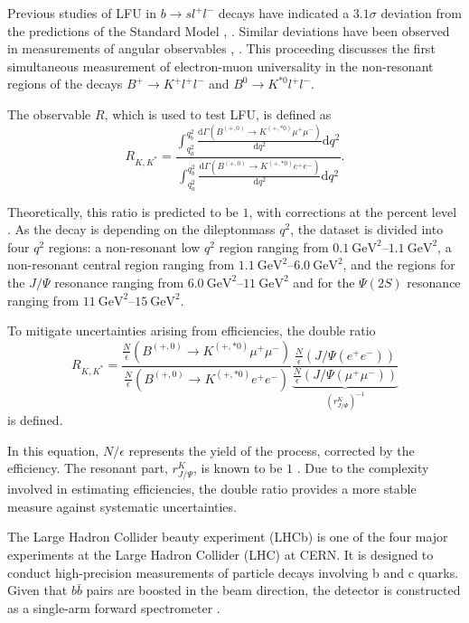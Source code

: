 Previous studies of LFU in $b\to sl^+l^-$ decays have indicated a $\num{3.1}\sigma$ 
deviation from the predictions of the Standard Model \cite{previous_RK}, \cite{previous_RK*}. 
Similar deviations have been observed in measurements of angular observables \cite{angular_1}, 
\cite{angular_2}. This proceeding discusses the first simultaneous measurement of electron-muon 
universality in the non-resonant regions of the decays $B^+\to K^+l^+l^-$ and $B^0\to K^{*0}l^+l^-$.

The observable $R$, which is used to test LFU, is defined as
\begin{equation}
    R_{K,K^*}= 
    \frac{\int_{q_a^2}^{q_b^2}\frac{\mathrm{d}\Gamma(B^{(+,0)}\to K^{(+,*0)}\mu^+\mu^-)}{\mathrm{d}q^2}\mathrm{d}q^2}
    {\int_{q_a^2}^{q_b^2}\frac{\mathrm{d}\Gamma(B^{(+,0)}\to K^{(+,*0)}e^+e^-)}{\mathrm{d}q^2}\mathrm{d}q^2} .
    \label{eqn:single_ratio}
\end{equation}

Theoretically, this ratio is predicted to be $\num{1}$, with corrections at 
the percent level \cite{LU_theo}. 
As the decay is depending on the dileptonmass $q^2$, the dataset is divided into four $q^2$ regions:
a non-resonant low $q^2$ region ranging from
$\SIrange{0.1}{1.1}{\giga\electronvolt\squared}$,
a non-resonant central region ranging from
$\SIrange{1.1}{6.0}{\giga\electronvolt\squared}$,
and the regions for the $J/\Psi$ resonance ranging from 
$\SIrange{6.0}{11}{\giga\electronvolt\squared}$
and for the $\Psi(2S)$ resonance ranging from
$\SIrange{11}{15}{\giga\electronvolt\squared}$.

To mitigate uncertainties arising from efficiencies, the double ratio 
\begin{equation}
    R_{K,K^*}= 
    \frac{\frac{N}{\epsilon}(B^{(+,0)}\to K^{(+,*0)}\mu^+\mu^-)}
    {\frac{N}{\epsilon}(B^{(+,0)}\to K^{(+,*0)}e^+e^-)}
    \underbrace{\frac{\frac{N}{\epsilon}(J/\Psi(e^+e^-))}{\frac{N}{\epsilon}(J/\Psi(\mu^+\mu^-))}}_{(r^K_{J/\Psi})^{-1}}
    \label{eqn:double_ratio}
\end{equation}
is defined.

In this equation, $N/\epsilon$ represents the yield of the process, corrected by 
the efficiency. The resonant part, $r^K_{J/\Psi}$, is known to be $\num{1}$ 
\cite{AULCHENKO2014227}. Due to the complexity involved in estimating efficiencies, 
the double ratio provides a more stable measure against systematic uncertainties.

The Large Hadron Collider beauty experiment (LHCb) is one of the four major experiments 
at the Large Hadron Collider (LHC) at CERN. It is designed to conduct high-precision 
measurements of particle decays involving b and c quarks. Given that $b\bar{b}$ pairs 
are boosted in the beam direction, the detector is constructed as a single-arm forward 
spectrometer \cite{LHCb}.


